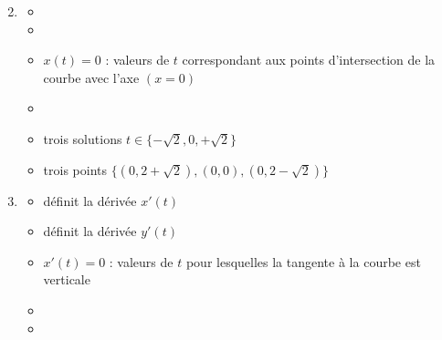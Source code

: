 \begin{frame}[fragile]

\begin{enumerate}  
  \setcounter{enumi}{1}
  \item 
  \begin{itemize}
    \item {}
    \item {}
    \pause
    \item $x(t)=0$ :  valeurs de $t$ correspondant aux points d'intersection de la courbe avec l'axe $(x=0)$
    \pause
    \item {}
    \pause
    \item trois solutions $t \in \{-\sqrt2,0,+\sqrt2\}$
    \pause
    \item trois points
$\{(0,2+\sqrt2),(0,0),(0,2-\sqrt2)\}$
  \end{itemize}

\bigskip
\pause
  
  \item
  \begin{itemize}
    \item {} définit la dérivée $x'(t)$
    
    \item {} définit la dérivée $y'(t)$
    \pause
    \item $x'(t)=0$ : valeurs de $t$ pour lesquelles la tangente à la courbe est verticale
    \pause
    \item {}   
    \pause
    \item {}     
  \end{itemize}    
\end{enumerate}  
\end{frame}


